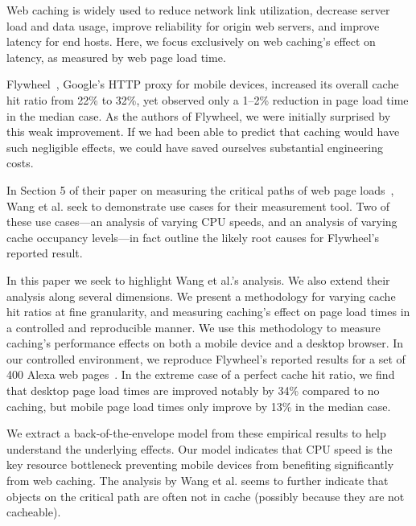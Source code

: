\label{intro}
Web caching is widely used to reduce network link utilization, decrease server load and data usage, improve reliability for origin web servers, and improve latency for end hosts.
Here, we focus exclusively on web caching's effect on latency, as measured by web page load time.

Flywheel~\cite{flywheel}, Google's HTTP proxy for mobile devices, increased
its overall cache hit ratio from 22\% to 32\%, yet observed only a 1--2\% reduction in page load time in the median case.
As the authors of Flywheel, we were initially surprised by this weak 
improvement. If we had been able to predict that caching would have such
negligible effects, we could have saved ourselves substantial engineering costs. %

In Section 5 of their paper on measuring the critical paths of web page 
loads~\cite{wang2013demystifying}, Wang et al. seek to demonstrate use 
cases for their measurement tool. Two of these use cases---an analysis of varying CPU speeds, and an analysis of varying cache occupancy levels---in fact outline the likely root causes for Flywheel's reported result.

In this paper we seek to highlight Wang et al.'s analysis. We also extend 
their analysis along several dimensions. We present 
a methodology for varying cache hit ratios at fine granularity,
and measuring caching's effect on page load times in a controlled and 
reproducible manner.
We use this methodology to measure caching's performance effects on both a mobile device and a desktop browser.
In our controlled environment, we reproduce Flywheel's reported results for
a set of
400 Alexa web pages~\cite{alexa}.
In the extreme case of a perfect cache hit ratio, we find that desktop page load times are improved notably by 34\% compared to no caching, but mobile page load times only improve by 13\% in the median case.

We extract a back-of-the-envelope model from these empirical results to help understand the underlying effects.
Our model indicates that CPU speed is the key resource bottleneck preventing mobile devices from benefiting significantly from web caching. 
The analysis by Wang et al. seems to further indicate that objects on the critical path are often not in cache (possibly because they are not cacheable).

